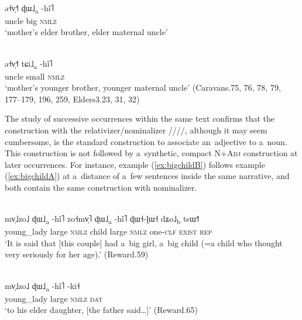 \begin{exe}
	\ex 
	\begin{xlist}
		\ex
		\label{ex:unc1}
		\\
		\gll 	ə˧v̩˧˥		ɖɯ˩\textsubscript{a}	-hĩ˥\\
		uncle		big		\textsc{nmlz}\\
		\glt ‘mother's elder brother, elder maternal uncle'
		
		\ex
		\label{ex:unc2}
		\\
		\gll 	ə˧v̩˧˥		tɕi˩\textsubscript{a}	-hĩ˥\\
		uncle		small		\textsc{nmlz}\\
		\glt ‘mother's younger brother, younger maternal uncle' (Caravans.75, 76, 78, 79, 177--179, 196, 259, Elders3.23, 31, 32)
	\end{xlist}
\end{exe}



The study of successive occurrences within the same text confirms that the construction with the
{relativizer}/{nominalizer} \mbox{////}, although it may seem cumbersome, is the
standard construction to associate an~adjective to a~noun. This construction is not followed by
a~synthetic, compact \textsc{N}+\textsc{Adj} construction at later occurrences. For instance, example (\ref{ex:bigchildB}) follows example (\ref{ex:bigchildA}) at a~distance of a~few sentences inside the same narrative, and both contain the same construction with nominalizer.

\begin{exe}
	\ex
	\label{ex:bigchildA}
	\\
	\gll mv̩˩zo˩	ɖɯ˩\textsubscript{a}	-hĩ˥	zo˧mv̩˥		ɖɯ˩\textsubscript{a}	-hĩ˥	ɖɯ˧-ɭɯ˧		dʑo˩\textsubscript{b}	tsɯ˧˥\\
	young\_lady		large	\textsc{nmlz}	child	large	\textsc{nmlz}	one-\textsc{clf}	\textsc{exist}	\textsc{rep}\\
	\glt ‘It is said that [this couple] had a~big girl, a~big child (=a child who thought
	very seriously for her age).’ (Reward.59)
\end{exe}

\begin{exe}
	\ex
	\label{ex:bigchildB}
	\\
	\gll mv̩˩zo˩	ɖɯ˩\textsubscript{a}	-hĩ˥	 -ki˧\\
	young\_lady		large		\textsc{nmlz}	\textsc{dat}\\
	\glt ‘to his elder daughter, [the father
	said{\dots}]’ (Reward.65)
\end{exe}

